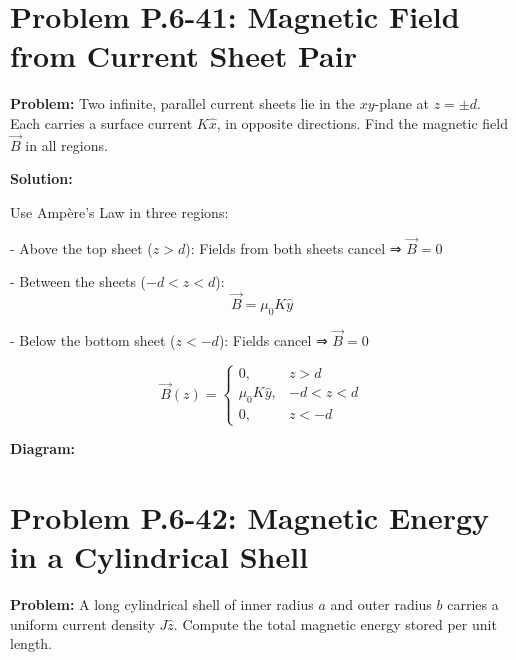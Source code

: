 \documentclass[12pt]{article}
\begin{document}
\section*{Problem P.6-41: Magnetic Field from Current Sheet Pair}

\textbf{Problem:}  
Two infinite, parallel current sheets lie in the \( xy \)-plane at \( z = \pm d \). Each carries a surface current \( K \hat{x} \), in opposite directions. Find the magnetic field \( \vec{B} \) in all regions.

\textbf{Solution:}

Use Ampère’s Law in three regions:

- Above the top sheet (\( z > d \)):  
  Fields from both sheets cancel ⇒ \( \vec{B} = 0 \)

- Between the sheets (\( -d < z < d \)):  
  \[
  \vec{B} = \mu_0 K \hat{y}
  \]

- Below the bottom sheet (\( z < -d \)):  
  Fields cancel ⇒ \( \vec{B} = 0 \)

\begin{tcolorbox}
\[
\boxed{
\vec{B}(z) =
\begin{cases}
0, & z > d \\
\mu_0 K \hat{y}, & -d < z < d \\
0, & z < -d
\end{cases}
}
\]
\end{tcolorbox}

\textbf{Diagram:}
\begin{center}
\end{center}



\section*{Problem P.6-42: Magnetic Energy in a Cylindrical Shell}

\textbf{Problem:}  
A long cylindrical shell of inner radius \( a \) and outer radius \( b \) carries a uniform current density \( J \hat{z} \). Compute the total magnetic energy stored per unit length.
\end{document}
